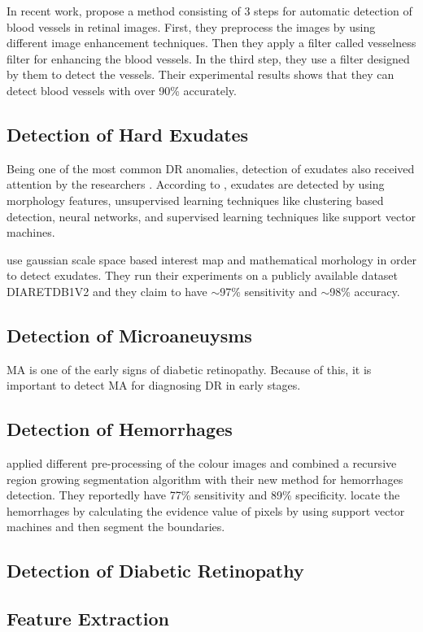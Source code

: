 In recent work, \citet{elbalaoui2016automatic} propose a method consisting of 3 steps for automatic detection of blood vessels in retinal images. First, they preprocess the images by using different image enhancement techniques. Then they apply a filter called vesselness filter for enhancing the blood vessels. In the third step, they use a filter designed by them to detect the vessels. Their experimental results shows that they can detect blood vessels with over 90\% accurately.   
\subsection{Detection of Hard Exudates}
Being one of the most common DR anomalies, detection of exudates also received attention by the researchers \citep{rocha2011points}.
According to \citet{zohoradetection}, exudates are detected by using morphology features, unsupervised learning techniques like clustering based detection, neural networks, and supervised learning techniques like support vector machines.

\citet{haloigaussian} use gaussian scale space based interest map and mathematical morhology in order to detect exudates. They run their experiments on a publicly available dataset DIARETDB1V2 and they claim to have $\sim$97\% sensitivity and $\sim$98\% accuracy.  



\subsection{Detection of Microaneuysms}
MA is one of the early signs of diabetic retinopathy. Because of this, it is important to detect MA for diagnosing DR in early stages.


\subsection{Detection of Hemorrhages}
\citet{sinthanayothin2002automated} applied different pre-processing of the colour images and combined a recursive region growing segmentation algorithm with their new method for hemorrhages detection. They reportedly have 77\% sensitivity and 89\% specificity.
\citet{zhang2005top}  locate the hemorrhages by calculating the evidence value of pixels by using support vector machines and then segment the boundaries.



\subsection{Detection of Diabetic Retinopathy}



\subsection{Feature Extraction}
